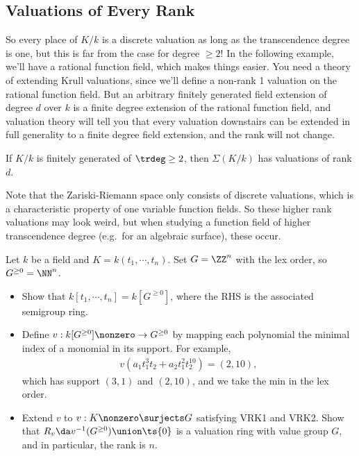 \hypertarget{valuations-of-every-rank}{%
\subsection{Valuations of Every Rank}\label{valuations-of-every-rank}}

So every place of \(K/k\) is a discrete valuation as long as the
transcendence degree is one, but this is far from the case for degree
\(\geq 2\)! In the following example, we'll have a rational function
field, which makes things easier. You need a theory of extending Krull
valuations, since we'll define a non-rank 1 valuation on the rational
function field. But an arbitrary finitely generated field extension of
degree \(d\) over \(k\) is a finite degree extension of the rational
function field, and valuation theory will tell you that every valuation
downstairs can be extended in full generality to a finite degree field
extension, and the rank will not change.

\begin{exercise}[?]

If \(K/k\) is finitely generated of \(\trdeg \geq 2\), then
\(\Sigma(K/k)\) has valuations of rank \(d\).

\end{exercise}

Note that the Zariski-Riemann space only consists of discrete
valuations, which is a characteristic property of one variable function
fields. So these higher rank valuations may look weird, but when
studying a function field of higher transcendence degree (e.g.~for an
algebraic surface), these occur.

\begin{exercise}

Let \(k\) be a field and \(K = k(t_1, \cdots, t_n)\). Set \(G = \ZZ^n\)
with the lex order, so \(G^{\geq 0} = \NN^n\).

\begin{itemize}
\item
  Show that \(k[t_1, \cdots, t_n] = k[G^{\geq 0}]\), where the RHS is
  the associated semigroup ring.
\item
  Define \(v: k[G^{\geq 0}]\nonzero \to G^{\geq 0}\) by mapping each
  polynomial the minimal index of a monomial in its support. For
  example,
  \begin{align*}  
  v(a_1 t_1^3 t_2 + a_2 t_1^2 t_2^{10})  = (2, 10)
  ,\end{align*} which has support \((3, 1)\) and \((2, 10)\), and we
  take the min in the lex order.
\item
  Extend \(v\) to \(v: K\nonzero \surjects G\) satisfying VRK1 and VRK2.
  Show that \(R_v \da v^{-1}(G^{\geq 0}) \union\ts{0}\) is a valuation
  ring with value group \(G\), and in particular, the rank is \(n\).
\end{itemize}

\end{exercise}

